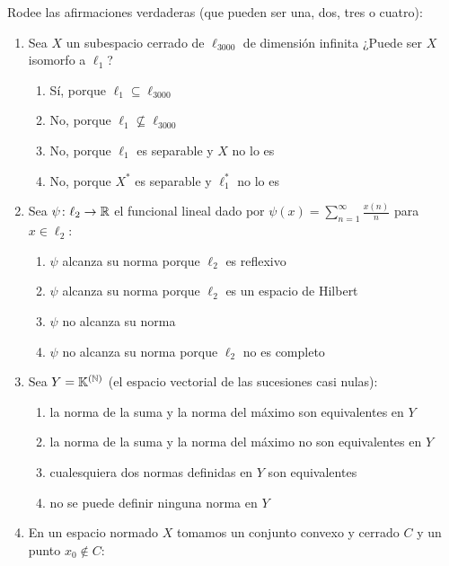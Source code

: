 \documentclass[12pt]{article}
\begin{document}
    \begin{ejercicio}
        Rodee las afirmaciones verdaderas (que pueden ser una, dos, tres o cuatro):
        \begin{enumerate}[label=\alph*)]
            \item Sea $X$ un subespacio cerrado de $\ell_{3000}$ de dimensión infinita ¿Puede ser $X$ isomorfo a $\ell_1$?
            \begin{enumerate}[label={a\arabic*)}]
                \item Sí, porque $\ell_1 \subseteq \ell_{3000}$
                \item No, porque $\ell_1 \nsubseteq \ell_{3000}$
                \item No, porque $\ell_1$ es separable y $X$ no lo es
                \item No, porque $X^*$ es separable y $\ell_1^*$ no lo es
            \end{enumerate}
            \item Sea $\psi \colon \ell_2 \to \mathbb{R}$ el funcional lineal dado por $\psi(x) = \sum\limits_{n=1}^\infty \frac{x(n)}{n}$ para $x \in \ell_2$:
            \begin{enumerate}[label={b\arabic*)}]
                \item $\psi$ alcanza su norma porque $\ell_2$ es reflexivo
                \item $\psi$ alcanza su norma porque $\ell_2$ es un espacio de Hilbert
                \item $\psi$ no alcanza su norma
                \item $\psi$ no alcanza su norma porque $\ell_2$ no es completo
            \end{enumerate}
            \item Sea $Y = \mathbb{K}^{(\mathbb{N})}$ (el espacio vectorial de las sucesiones casi nulas):
            \begin{enumerate}[label={c\arabic*)}]
                \item la norma de la suma y la norma del máximo son equivalentes en $Y$
                \item la norma de la suma y la norma del máximo no son equivalentes en $Y$
                \item cualesquiera dos normas definidas en $Y$ son equivalentes
                \item no se puede definir ninguna norma en $Y$
            \end{enumerate}
            \item En un espacio normado $X$ tomamos un conjunto convexo y cerrado $C$ y un punto $x_0 \notin C$:

\end{enumerate}
\end{ejercicio}
\end{document}

